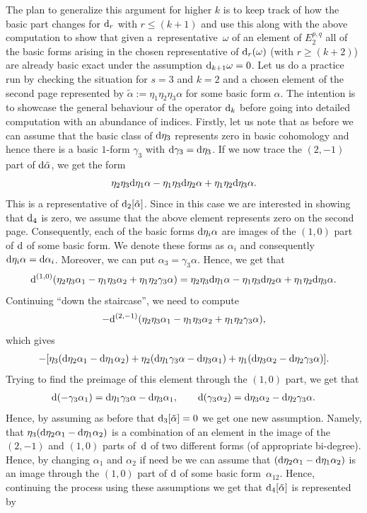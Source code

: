 \documentclass[10pt,a4paper]{amsart}
\numberwithin{equation}{section}
\theoremstyle{definition}
\begin{document}
The plan to generalize this argument for higher $k$ is to keep track of how the basic part changes for ${\rm d}_r$ with $r\leq (k+1)$ and use this along with the above computation to show that given a~representative~$\omega$ of an element of $E_2^{p,q}$ all of the basic forms arising in the chosen representative of ${\rm d}_r(\omega)$ (with $r\geq (k+2)$) are already basic exact under the assumption ${\rm d}_{k+1}\omega=0$. Let us do a practice run by checking the situation for $s=3$ and $k=2$ and a chosen element of the second page represented by $\tilde{\alpha}:=\eta_1\eta_2\eta_3\alpha$ for some basic form $\alpha$. The intention is to showcase the general behaviour of the operator ${\rm d}_k$ before going into detailed computation with an abundance of indices. Firstly, let us note that as before we can assume that the basic class of ${\rm d}\eta_3$ represents zero in basic cohomology and hence there is a basic $1$-form $\gamma_3$ with ${\rm d}\gamma_3={\rm d}\eta_3$. If we now trace the $(2,-1)$ part of ${\rm d}\tilde{\alpha}$, we get the form
\[\eta_2\eta_3{\rm d}\eta_1\alpha-\eta_1\eta_3{\rm d}\eta_2\alpha+\eta_1\eta_2{\rm d}\eta_3\alpha.\]
This is a representative of ${\rm d}_2[\tilde{\alpha}]$. Since in this case we are interested in showing that ${\rm d}_4$ is zero, we assume that the above element represents zero on the second page. Consequently, each of the basic forms ${\rm d}\eta_i\alpha$ are images of the $(1,0)$ part of ${\rm d}$ of some basic form. We denote these forms as $\alpha_i$ and consequently
${\rm d}\eta_i\alpha={\rm d}\alpha_i$.
Moreover, we can put
$\alpha_3=\gamma_3\alpha$.
Hence, we get that
\[{\rm d}^{(1,0)}(\eta_2\eta_3\alpha_1-\eta_1\eta_3\alpha_2+\eta_1\eta_2\gamma_3\alpha)= \eta_2\eta_3{\rm d}\eta_1\alpha-\eta_1\eta_3{\rm d}\eta_2\alpha+\eta_1\eta_2{\rm d}\eta_3\alpha.\]
Continuing ``down the staircase'', we need to compute
\[-{\rm d}^{(2,-1)}(\eta_2\eta_3\alpha_1-\eta_1\eta_3\alpha_2+\eta_1\eta_2\gamma_3\alpha),\]
which gives
\[-[\eta_3({\rm d}\eta_2\alpha_1-{\rm d}\eta_1\alpha_2)+\eta_2({\rm d}\eta_1\gamma_3\alpha-{\rm d}\eta_3\alpha_1)+\eta_1({\rm d}\eta_3\alpha_2-{\rm d}\eta_2\gamma_3\alpha)].\]
Trying to find the preimage of this element through the $(1,0)$ part, we get that
\begin{gather*}
{\rm d}(-\gamma_3\alpha_1)={\rm d}\eta_1\gamma_3\alpha-{\rm d}\eta_3\alpha_1,\qquad
{\rm d}(\gamma_3\alpha_2)={\rm d}\eta_3\alpha_2-{\rm d}\eta_2\gamma_3\alpha.
\end{gather*}
Hence, by assuming as before that ${\rm d}_3[\tilde{\alpha}]=0$ we get one new assumption. Namely, that $\eta_3({\rm d}\eta_2\alpha_1-{\rm d}\eta_1\alpha_2)$ is a combination of an element in the image of the $(2,-1)$ and $(1,0)$ parts of~${\rm d}$ of two different forms (of appropriate bi-degree). Hence, by changing $\alpha_1$ and $\alpha_2$ if need be we can assume that $({\rm d}\eta_2\alpha_1-{\rm d}\eta_1\alpha_2)$ is an image through the $(1,0)$ part of ${\rm d}$ of some basic form~$\alpha_{12}$. Hence, continuing the process using these assumptions we get that ${\rm d}_4[\tilde{\alpha}]$ is represented by
\end{document}
